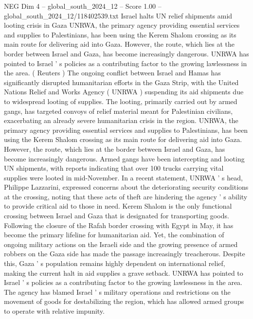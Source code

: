 \begin{textsample}{NEG Dim 4 – global\_south\_2024\_12 – Score 1.00 – global\_south\_2024\_12/118402539.txt}  \label{ex:f4_neg_223}
Israel halts UN relief shipments amid looting crisis in Gaza UNRWA, the primary agency providing essential services and supplies to Palestinians, has been using the Kerem Shalom crossing as its main route for delivering aid into Gaza.
However, the route, which lies at the border between Israel and Gaza, has become increasingly dangerous.
UNRWA has pointed to Israel ' s policies as a contributing factor to the growing lawlessness in the area. ( Reuters ) The ongoing conflict between Israel and Hamas has significantly disrupted humanitarian efforts in the Gaza Strip, with the United Nations Relief and Works Agency ( UNRWA ) suspending its aid shipments due to widespread looting of supplies.
The looting, primarily carried out by armed gangs, has targeted convoys of relief material meant for Palestinian civilians, exacerbating an already severe humanitarian crisis in the region.
UNRWA, the primary agency providing essential services and supplies to Palestinians, has been using the Kerem Shalom crossing as its main route for delivering aid into Gaza.
However, the route, which lies at the border between Israel and Gaza, has become increasingly dangerous.
Armed gangs have been intercepting and looting UN shipments, with reports indicating that over 100 trucks carrying vital supplies were looted in mid-November.
In a recent statement, UNRWA ' s head, Philippe Lazzarini, expressed concerns about the deteriorating security conditions at the crossing, noting that these acts of theft are hindering the agency ' s ability to provide critical aid to those in need.
Kerem Shalom is the only functional crossing between Israel and Gaza that is designated for transporting goods.
Following the closure of the Rafah border crossing with Egypt in May, it has become the primary lifeline for humanitarian aid.
Yet, the combination of ongoing military actions on the Israeli side and the growing presence of armed robbers on the Gaza side has made the passage increasingly treacherous.
Despite this, Gaza ' s population remains highly dependent on international relief, making the current halt in aid supplies a grave setback.
UNRWA has pointed to Israel ' s policies as a contributing factor to the growing lawlessness in the area.
The agency has blamed Israel ' s military operations and restrictions on the movement of goods for destabilizing the region, which has allowed armed groups to operate with relative impunity.

\end{textsample}
